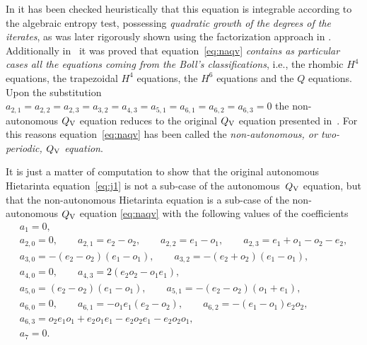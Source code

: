\documentclass[pdftex]{sigma}
\numberwithin{equation}{section}
\newcommand{\QV}{Q_{\rm V}}
\begin{document}
In \cite{GSL_QV} it has been checked heuristically
that this equation is integrable according to the
algebraic entropy test, possessing \emph{quadratic
growth of the degrees of the iterates}, as was later rigorously
shown using the factorization approach in \cite{RobertsTran2017}.
Additionally in~\cite{GSL_QV} it was proved that
equation~\eqref{eq:naqv} \emph{contains as particular cases
all the equations coming from the Boll's classifications},
i.e., the rhombic $H^{4}$ equations, the trapezoidal $H^{4}$
equations, the $H^{6}$ equations and the $Q$ equations.
Upon the substitution
$a_{2,1}=a_{2,2}=a_{2,3}=a_{3,2}=a_{4,3}=a_{5,1}=a_{6,1}=a_{6,2}=a_{6,3}=0$
the non-autonomous $\QV$ equation reduces to
the original $\QV$ equation presented in~\cite{Viallet2009}.
For this reasons equation~\eqref{eq:naqv} has been
called the \emph{non-autonomous, or two-periodic, $\QV$ equation}.

It is just a matter of computation to show that the original
autonomous Hietarinta equation~\eqref{eq:j1} is not
a sub-case of the autonomous~$\QV$ equation, but that
the non-autonomous Hietarinta equation is a sub-case of
the non-autonomous $\QV$ equation \eqref{eq:naqv} with
the following values of the coef\/f\/icients
\begin{subequations} \label{eq:j1cf}
 \begin{gather}
 a_{1} = 0, \\
 a_{2,0} = 0,\qquad
 a_{2,1} = e_{2}-o_{2},\qquad
 a_{2,2} = e_{1}-o_{1},\qquad
 a_{2,3} = e_{1}+o_{1}-o_{2}-e_{2}, \\
 a_{3,0} = -(e_{2}-o_{2}) (e_{1}-o_{1}),\qquad
 a_{3,2} = -(e_{2}+o_{2}) (e_{1}-o_{1}), \\
 a_{4,0} = 0,\qquad
 a_{4,3} = 2 (e_{2} o_{2} - o_{1} e_{1}), \\
 a_{5,0} = (e_{2}-o_{2}) (e_{1}-o_{1}),\qquad
 a_{5,1} = -(e_{2}-o_{2}) (o_{1}+e_{1}), \\
 a_{6,0} = 0,\qquad
 a_{6,1} = -o_{1} e_{1} (e_{2}-o_{2}),\qquad a_{6,2} = -(e_{1}-o_{1}) e_{2} o_{2},\nonumber \\
 a_{6,3} = o_{2} e_{1} o_{1}+e_{2} o_{1} e_{1}-e_{2} o_{2} e_{1}-e_{2} o_{2} o_{1}, \\
 a_{7} = 0.
 \end{gather}
\end{subequations}
\end{document}
